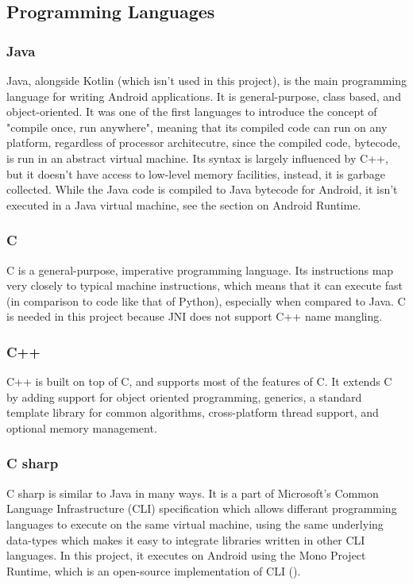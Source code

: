     \subsection{Programming Languages}
        \subsubsection{Java}
        Java, alongside Kotlin (which isn't used in this project), is the main programming language for writing Android applications. It is general-purpose, class based, and object-oriented. It was one of the first languages to introduce the concept of "compile once, run anywhere", meaning that its compiled code can run on any platform, regardless of processor architecutre, since the compiled code, bytecode, is run in an abstract virtual machine. Its syntax is largely influenced by C++, but it doesn't have access to low-level memory facilities, instead, it is garbage collected. While the Java code is compiled to Java bytecode for Android, it isn't executed in a Java virtual machine, see the section on Android Runtime.
        \subsubsection{C}
        C is a general-purpose, imperative programming language. Its instructions map very closely to typical machine instructions, which means that it can execute fast (in comparison to code like that of Python), especially when compared to Java. C is needed in this project because JNI does not support C++ name mangling.
        \subsubsection{C++}
        C++ is built on top of C, and supports most of the features of C. It extends C by adding support for object oriented programming, generics, a standard template library for common algorithms, cross-platform thread support, and optional memory management.
        \subsubsection{C sharp}
        C sharp is similar to Java in many ways. It is a part of Microsoft's Common Language Infrastructure (CLI) specification which allows differant programming languages to execute on the same virtual machine, using the same underlying data-types which makes it easy to integrate libraries written in other CLI languages. In this project, it executes on Android using the Mono Project Runtime, which is an open-source implementation of CLI (\cite{monoproject}).

